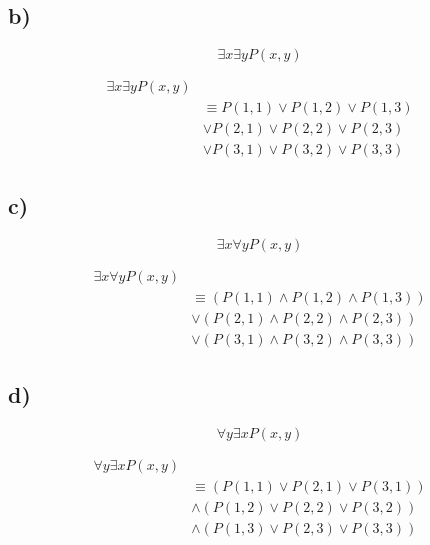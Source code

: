 \documentclass{article}
\begin{document}
\subsection{b)}
$$ \exists x \exists y P(x, y) $$

\begin{align*}
	\exists x \exists y P(x, y) &                                          \\
	                            & \equiv P(1, 1) \lor P(1, 2) \lor P(1, 3) \\
	                            & \lor P(2, 1) \lor P(2, 2) \lor P(2, 3)   \\
	                            & \lor P(3, 1) \lor P(3, 2) \lor P(3, 3)
\end{align*}

\subsection{c)}
$$ \exists x \forall y P(x, y) $$

\begin{align*}
	\exists x \forall y P(x, y) &                                                           \\
	                            & \equiv \left( P(1, 1) \land P(1, 2) \land P(1, 3) \right) \\
	                            & \lor \left( P(2, 1) \land P(2, 2) \land P(2, 3) \right)   \\
	                            & \lor \left( P(3, 1) \land P(3, 2) \land P(3, 3) \right)
\end{align*}

\subsection{d)}
$$ \forall y \exists x P(x, y) $$

\begin{align*}
	\forall y \exists x P(x, y) &                                                         \\
	                            & \equiv \left( P(1, 1) \lor P(2, 1) \lor P(3, 1) \right) \\
	                            & \land \left( P(1, 2) \lor P(2, 2) \lor P(3, 2) \right)  \\
	                            & \land \left( P(1, 3) \lor P(2, 3) \lor P(3, 3) \right)
\end{align*}
\end{document}
